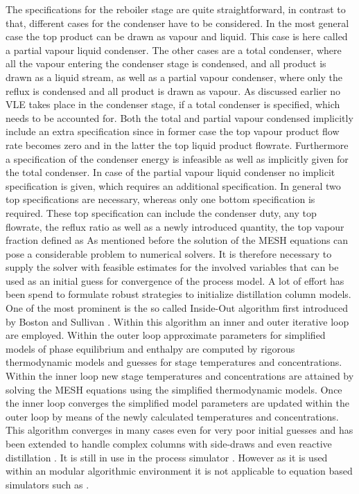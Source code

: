         The specifications for the reboiler stage are quite straightforward, in contrast to that,
        different cases for the condenser have to be considered. In the most general case the
        top product can be drawn as vapour and liquid. This case is here called a partial vapour
        liquid condenser. The other cases are a total condenser, where all the vapour entering the
        condenser stage is condensed, and all product is drawn as a liquid stream, as well as
        a partial vapour condenser, where only the reflux is condensed and all product is drawn
        as vapour. As discussed earlier no VLE takes place in the condenser stage, if a total
        condenser is specified, which needs to be accounted for. Both the total and partial
        vapour condensed implicitly include an extra specification since in former case
        the top vapour product flow rate becomes zero and in the latter the top liquid product
        flowrate. Furthermore a specification of the condenser energy is infeasible as well as implicitly
        given for the total condenser. In case of the partial vapour liquid condenser no implicit
        specification is given, which requires an additional specification. In general two
        top specifications are necessary, whereas only one bottom specification is required.
        These top specification can include the condenser duty, any top flowrate, the reflux ratio
        as well as a newly introduced quantity, the top vapour fraction defined as
        As mentioned before the solution of the MESH equations can pose a considerable problem
        to numerical solvers. It is therefore necessary to supply the solver with feasible
        estimates for the involved variables that can be used as an initial guess for
        convergence of the process model. A lot of effort has been spend to formulate robust strategies
        to initialize distillation column models. One of the most prominent is the so called
        Inside-Out algorithm first introduced by Boston and Sullivan \cite{Boston.1974}. Within this
        algorithm an inner and outer iterative loop are employed. Within the outer loop approximate
        parameters for simplified models of phase equilibrium and enthalpy are computed by rigorous
        thermodynamic models and guesses for stage temperatures and concentrations. Within the
        inner loop new stage temperatures and concentrations are attained by solving the MESH equations
        using the simplified thermodynamic models. Once the inner loop converges the simplified
        model parameters are updated within the outer loop by means of the newly calculated
        temperatures and concentrations. This algorithm converges in many cases even for very poor initial
        guesses and has been extended to handle complex columns with side-draws and even reactive
        distillation \cite{Boston.}. It is still in use in the process simulator \aspen.
        However as it is used within an modular algorithmic environment it is not applicable
        to equation based simulators such as \gproms.

